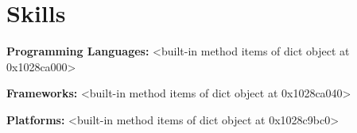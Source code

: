 \section{Skills}

    \begin{onecolentry}
        \textbf{Programming Languages:} <built-in method items of dict object at 0x1028ca000>
    \end{onecolentry}

    \vspace{0.05 cm}

    \begin{onecolentry}
        \textbf{Frameworks:} <built-in method items of dict object at 0x1028ca040>
    \end{onecolentry}

    \vspace{0.05 cm}

    \begin{onecolentry}
        \textbf{Platforms:} <built-in method items of dict object at 0x1028c9bc0>
    \end{onecolentry}

    \vspace{0.05 cm}

